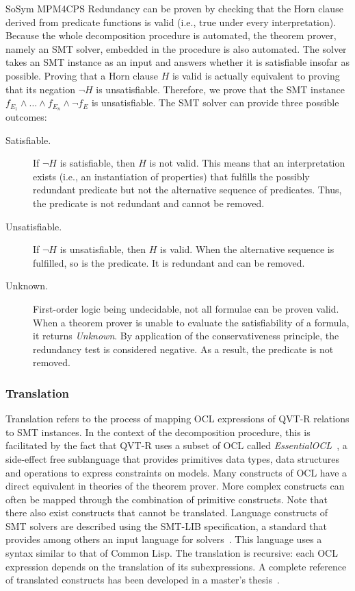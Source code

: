 \begin{copiedFrom}{SoSym MPM4CPS}
Redundancy can be proven by checking that the Horn clause derived from predicate functions is valid (i.e., true under every interpretation). Because the whole decomposition procedure is automated, the theorem prover, namely an SMT solver, embedded in the procedure is also automated. 
The solver takes an SMT instance as an input and answers whether it is satisfiable insofar as possible.
Proving that a Horn clause $H$ is valid is actually equivalent to proving that its negation $\neg H$ is unsatisfiable. Therefore, we prove that the SMT instance $f_{E_1} \wedge \dots \wedge f_{E_n} \wedge \neg f_{E}$ is unsatisfiable. The SMT solver can provide three possible outcomes:

\begin{description}
    \item[Satisfiable.] If $\neg H$ is satisfiable, then $H$ is not valid. This means that an interpretation exists (i.e., an instantiation of properties) that fulfills the possibly redundant predicate but not the alternative sequence of predicates. Thus, the predicate is not redundant and cannot be removed.
    \item[Unsatisfiable.] If $\neg H$ is unsatisfiable, then $H$ is valid. When the alternative sequence is fulfilled, so is the predicate. It is redundant and can be removed.
    \item[Unknown.] First-order logic being undecidable, not all formulae can be proven valid. When a theorem prover is unable to evaluate the satisfiability of a formula, it returns \textit{Unknown}. By application of the conservativeness principle, the redundancy test is considered negative. As a result, the predicate is not removed.
\end{description}

\subsubsection{Translation}

Translation refers to the process of mapping OCL expressions of QVT-R relations to SMT instances. In the context of the decomposition procedure, this is facilitated by the fact that QVT-R uses a subset of OCL called \textit{EssentialOCL}~\cite{qvt}, a side-effect free sublanguage that provides primitives data types, data structures and operations to express constraints on models. Many constructs of OCL have a direct equivalent in theories of the theorem prover. More complex constructs can often be mapped through the combination of primitive constructs. Note that there also exist constructs that cannot be translated. Language constructs of SMT solvers are described using the SMT-LIB specification, a standard that provides among others an input language for solvers~\cite{smtlib2017}. This language uses a syntax similar to that of Common Lisp. The translation is recursive: each OCL expression depends on the translation of its subexpressions. A complete reference of translated constructs has been developed in a master's thesis~\cite{pepin2019ma}.


\end{copiedFrom}

